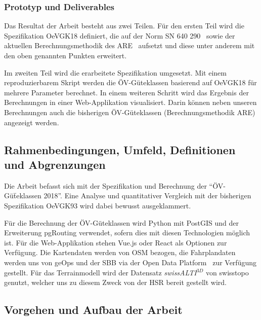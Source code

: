 \subsubsection{Prototyp und Deliverables}
\label{Ziele und Unterziele:Prototyp und Deliverables}

Das Resultat der Arbeit besteht aus zwei Teilen.
Für den ersten Teil wird die Spezifikation \gls{OeVGK18} definiert, die auf der Norm SN 640 290~\cite{sn640290} sowie der aktuellen Berechnungsmethodik des \acs{ARE}~\cite{berechnung_are} aufsetzt und diese unter anderem mit den oben genannten Punkten erweitert.

Im zweiten Teil wird die erarbeitete Spezifikation umgesetzt.
Mit einem reproduzierbarem Skript werden die \acs{ÖV}-Güteklassen basierend auf \gls{OeVGK18} für mehrere Parameter berechnet.
In einem weiteren Schritt wird das Ergebnis der Berechnungen in einer Web-Applikation visualisiert.
Darin können neben unseren Berechnungen auch die bisherigen \acs{ÖV}-Güteklassen (Berechnungsmethodik \acs{ARE}) angezeigt werden.

\subsection{Rahmenbedingungen, Umfeld, Definitionen und Abgrenzungen}
\label{Einführung:Rahmenbedingungen, Umfeld, Definitionen, Abgrenzungen}

Die Arbeit befasst sich mit der Spezifikation und Berechnung der "`ÖV-Güẗeklassen 2018"'.
Eine Analyse und quantitativer Vergleich mit der bisherigen Spezifikation \gls{OeVGK93} wird dabei bewusst ausgeklammert.

Für die Berechnung der ÖV-Güteklassen wird Python mit PostGIS und der Erweiterung pgRouting verwendet, sofern dies mit diesen Technologien möglich ist.
Für die Web-Applikation stehen Vue.js oder React als Optionen zur Verfügung. Die Kartendaten werden von \ac{OSM} bezogen, die Fahrplandaten werden uns von geOps und der SBB via der Open Data Platform~\cite{sbb_open_transport_data} zur Verfügung gestellt.
Für das \gls{Terrainmodell} wird der Datensatz \emph{swissALTI$^{3D}$} von swisstopo~\cite{swissalti3d_swisstopo} genutzt, welcher uns zu diesem Zweck von der HSR bereit gestellt wird.

\subsection{Vorgehen und Aufbau der Arbeit}
\label{Einführung:Vorgehen und Aufbau der Arbeit}

